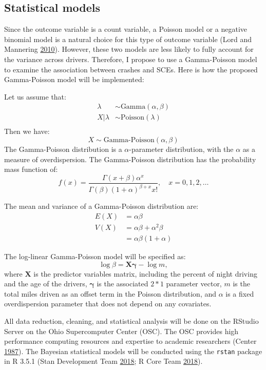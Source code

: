 \documentclass[12pt]{book}
\numberwithin{equation}{chapter}
\begin{document}
\hypertarget{statistical-models}{%
\subsection{Statistical models}\label{statistical-models}}

Since the outcome variable is a count variable, a Poisson model or a negative binomial model is a natural choice for this type of outcome variable (Lord and Mannering \protect\hyperlink{ref-lord2010statistical}{2010}). However, these two models are less likely to fully account for the variance across drivers. Therefore, I propose to use a Gamma-Poisson model to examine the association between crashes and SCEs. Here is how the proposed Gamma-Poisson model will be implemented:

Let us assume that:
\[
\begin{aligned}
\lambda & \sim \text{Gamma}(\alpha, \beta)\\
X|\lambda & \sim \text{Poisson}(\lambda)\\
\end{aligned}
\]
Then we have:
\[X \sim \text{Gamma-Poisson}(\alpha, \beta)\]
The Gamma-Poisson distribution is a \(\alpha\)-parameter distribution, with the \(\alpha\) as a measure of overdispersion. The Gamma-Poisson distribution has the probability mass function of:
\[f(x) = \frac{\Gamma(x + \beta)\alpha^x}{\Gamma(\beta)(1 + \alpha)^{\beta + x}x!}, \quad x = 0, 1, 2, \dots\]

The mean and variance of a Gamma-Poisson distribution are:
\[
\begin{aligned}
E(X) & = \alpha\beta \\
V(X) & = \alpha\beta + \alpha^2\beta\\
     & = \alpha\beta(1 + \alpha)
\end{aligned}
\]

The log-linear Gamma-Poisson model will be specified as:
\[
\log\beta = \mathbf{X\gamma} - \log m,
\]
where \(\mathbf{X}\) is the predictor variables matrix, including the percent of night driving and the age of the drivers, \(\mathbf{\gamma}\) is the associated \(2*1\) parameter vector, \(m\) is the total miles driven as an offset term in the Poisson distribution, and \(\alpha\) is a fixed overdispersion parameter that does not depend on any covariates.

All data reduction, cleaning, and statistical analysis will be done on the RStudio Server on the Ohio Supercomputer Center (OSC). The OSC provides high performance computing resources and expertise to academic researchers (Center \protect\hyperlink{ref-OSC1987}{1987}). The Bayesian statistical models will be conducted using the \texttt{rstan} package in R 3.5.1 (Stan Development Team \protect\hyperlink{ref-rstancitation}{2018}; R Core Team \protect\hyperlink{ref-Rcitation}{2018}).
\end{document}
